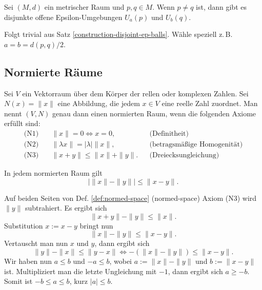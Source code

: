 \begin{Korollar}
Sei $(M,d)$ ein metrischer Raum und $p,q\in M$.
Wenn $p\ne q$ ist, dann gibt es disjunkte offene
Epsilon-Umgebungen $U_a(p)$ und $U_b(q)$.
\end{Korollar}

\begin{Beweis}
Folgt trivial aus Satz \ref{construction-disjoint-ep-balls}.
Wähle speziell z.\,B. $a=b=d(p,q)/2$.\,\qedsymbol
\end{Beweis}

\subsection{Normierte Räume}
\begin{Definition}%
\label{def:normed-space}
Sei $V$ ein Vektorraum über dem Körper der rellen oder komplexen
Zahlen. Sei $N(x)=\|x\|$ eine Abbildung, die jedem $x\in V$ eine
reelle Zahl zuordnet. Man nennt $(V,N)$ genau dann einen
normierten Raum, wenn die folgenden Axiome erfüllt sind:
\begin{align*}
\text{(N1)}\quad &\|x\|=0\iff x=0,&&\text{(Definitheit)}\\
\text{(N2)}\quad &\|\lambda x\|=|\lambda|\|x\|,&&\text{(betragsmäßige Homogenität)}\\
\text{(N3)}\quad &\|x+y\| \le \|x\|+\|y\|.&&\text{(Dreiecksungleichung)}
\end{align*}
\end{Definition}

\begin{Satz}%
\label{rev-tineq}%
In jedem normierten Raum gilt
\[|\|x\|-\|y\|| \le \|x-y\|.\]
\end{Satz}
\begin{Beweis}
Auf beiden Seiten von Def. \ref{def:normed-space} (normed-space)
Axiom (N3) wird $\|y\|$ subtrahiert.
Es ergibt sich
\[\|x+y\| - \|y\| \le \|x\|.\]
Substitution $x:=x-y$ bringt nun
\[\|x\| - \|y\| \le \|x-y\|.\]
Vertauscht man nun $x$ und $y$, dann ergibt sich
\[\|y\|-\|x\| \le \|y-x\| \iff -(\|x\|-\|y\|)\le \|x-y\|.\]
Wir haben nun $a\le b$ und $-a\le b$,
wobei $a:=\|x\|-\|y\|$ und $b:=\|x-y\|$ ist. Multipliziert
man die letzte Ungleichung mit $-1$, dann ergibt sich $a\ge -b$.
Somit ist $-b\le a\le b$, kurz $|a|\le b$.\,\qedsymbol
\end{Beweis}

